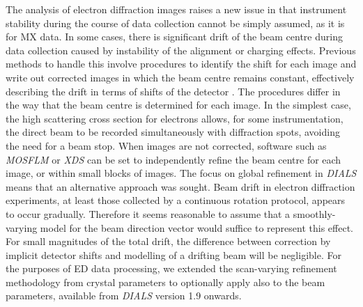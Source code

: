 \documentclass[preprint]{iucr}
\newcommand{\dials}{\emph{DIALS}\xspace}
\newcommand{\xds}{\emph{XDS}\xspace}
\newcommand{\mosflm}{\emph{MOSFLM}\xspace}
\begin{document}
The analysis of electron
diffraction images raises a new issue in that instrument stability during the
course of data collection cannot be simply assumed, as it is for MX data. In
some cases, there is significant drift of the beam centre during data
collection caused by instability of the alignment or charging effects.
Previous methods to handle this involve procedures to identify the shift
for each image and write out corrected images in which the beam centre remains
constant, effectively describing the drift in terms of shifts of the detector
\cite{Wan2013,Nederlof2013,Hattne2015}. The procedures differ in the
way that the beam centre is determined for each image. In the simplest case,
the high scattering cross section for electrons allows, for some
instrumentation, the direct beam to be
recorded simultaneously with diffraction spots, avoiding the need for a beam
stop. When images are not corrected,
software such as \mosflm or \xds can be set to independently refine the beam
centre for each image, or within small blocks of images.
The focus on global refinement in \dials means that an alternative approach was
sought. Beam drift in electron diffraction experiments, at least those
collected by a continuous rotation protocol, appears to occur gradually.
Therefore it seems reasonable to assume that a smoothly-varying model for the
beam direction vector would suffice to represent this effect. For small
magnitudes of the total drift, the difference between correction by implicit
detector shifts and modelling of a drifting beam will be negligible. For the
purposes of ED data processing, we extended the scan-varying refinement
methodology from crystal parameters to optionally apply also to the beam
parameters, available from \dials version 1.9 onwards.
\end{document}
